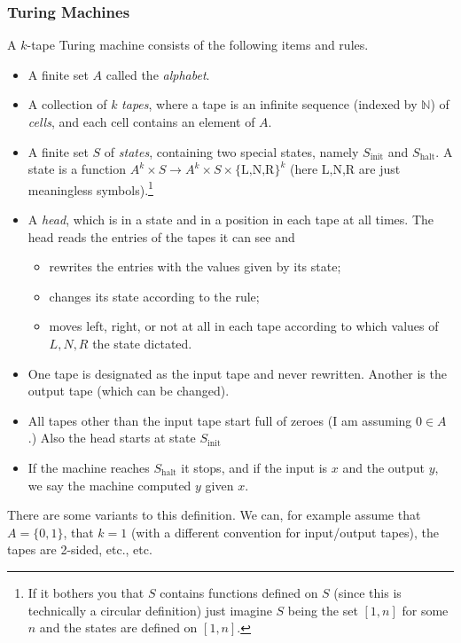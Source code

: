 \documentclass{report}
\theoremstyle{definition}
\theoremstyle{plain}
\theoremstyle{definition}
\begin{document}
	\subsubsection*{Turing Machines}
	A $k$-tape Turing machine consists of the following items and rules.
	\begin{itemize}
		\item A finite set $A$ called the \emph{alphabet}.
		\item A collection of $k$ \emph{tapes}, where a tape is an infinite sequence (indexed by $\mathbb{N}$) of \emph{cells}, and each cell contains an element of $A$.
		\item A finite set $S$ of \emph{states}, containing two special states, namely $S_{\text{init}}$ and $S_{\text{halt}}$. A state is a function $A^k\times S \to A^k \times S\times \{\text{L,N,R}\}^k$ (here L,N,R are just meaningless symbols).\footnote{If it bothers you that $S$ contains functions defined on $S$ (since this is technically a circular definition) just imagine $S$ being the set $[1,n]$ for some $n$ and the states are defined on $[1,n]$.}
		\item A \emph{head}, which is in a state and in a position in each tape at all times. The head reads the entries of the tapes it can see and
		\begin{itemize}
			\item rewrites the entries with the values given by its state;
			\item changes its state according to the rule;
			\item moves left, right, or not at all in each tape according to which values of $L,N,R$ the state dictated.
		\end{itemize}
		\item One tape is designated as the input tape and never rewritten. Another is the output tape (which can be changed).
		\item All tapes other than the input tape start full of zeroes (I am assuming $0\in A$.) Also the head starts at state $S_{\text{init}}$
		\item If the machine reaches $S_{\text{halt}}$ it stops, and if the input is $x$ and the output $y$, we say the machine computed $y$ given $x$.
	\end{itemize}
	There are some variants to this definition. We can, for example assume that $A=\{0,1\}$, that $k=1$ (with a different convention for input/output tapes), the tapes are 2-sided, etc., etc.
\end{document}
